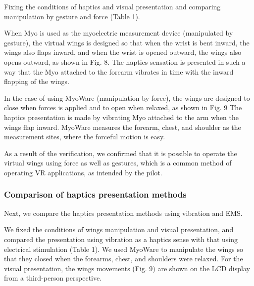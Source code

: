 \documentclass[letterpaper, 10 pt, conference]{ieeeconf}  %
\begin{document}
                        Fixing the conditions of haptics and visual presentation and comparing manipulation by gesture and force (Table 1).

                
                        When Myo is used as the myoelectric measurement device (manipulated by gesture), the virtual wings is designed so that when the wrist is bent inward, the wings also flaps inward, and when the wrist is opened outward, the wings also opens outward, as shown in Fig. 8.  
                        The haptics sensation is presented in such a way that the Myo attached to the forearm vibrates in time with the inward flapping of the wings.  

                        In the case of using MyoWare (manipulation by force), the wings are designed to close when forces is applied and to open when relaxed, as shown in Fig. 9  
                        The haptics presentation is made by vibrating Myo attached to the arm when the wings flap inward.  
                        MyoWare measures the forearm, chest, and shoulder as the measurement sites, where the forceful motion is easy.  

                        As a result of the verification, we confirmed that it is possible to operate the virtual wings using force as well as gestures, which is a common method of operating VR applications, as intended by the pilot.  


                \subsubsection{Comparison of haptics presentation methods}
                        Next, we compare the haptics presentation methods using vibration and EMS.  

                        We fixed the conditions of wings manipulation and visual presentation, and compared the presentation using vibration as a haptics sense with that using electrical stimulation (Table 1).  
                        We used MyoWare to manipulate the wings so that they closed when the forearms, chest, and shoulders were relaxed.  
                        For the visual presentation, the wings movements (Fig. 9) are shown on the LCD display from a third-person perspective.  
\end{document}
